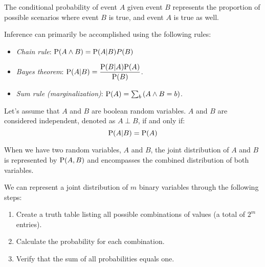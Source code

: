 \begin{definition}
    The conditional probability of event $A$ given event $B$ represents the proportion of possible scenarios where event $B$ is true, and event $A$ is true as well.
\end{definition}
Inference can primarily be accomplished using the following rules:
\begin{itemize}
    \item \textit{Chain rule}: $\textnormal{P}(A \land B)=\textnormal{P}(A|B)P(B)$
    \item \textit{Bayes theorem}: $\textnormal{P}(A|B)=\dfrac{\textnormal{P}(B|A)\textnormal{P}(A)}{\textnormal{P}(B)}$.
    \item \textit{Sum rule (marginalization)}: $\textnormal{P}(A)=\sum_{b}{(A \land B=b)}$.
\end{itemize}
\begin{definition}
    Let's assume that $A$ and $B$ are boolean random variables. $A$ and $B$ are considered independent, denoted as $A \perp B$, if and only if:
    \[\textnormal{P}(A|B)=\textnormal{P}(A)\]
\end{definition}
\begin{definition}
    When we have two random variables, $A$ and $B$, the joint distribution of $A$ and $B$ is represented by $\textnormal{P}(A, B)$ and encompasses the combined distribution of both variables.    
\end{definition}
We can represent a joint distribution of $m$ binary variables through the following steps:
\begin{enumerate}
    \item Create a truth table listing all possible combinations of values (a total of $2^m$ entries).
    \item Calculate the probability for each combination.
    \item Verify that the sum of all probabilities equals one.
\end{enumerate}